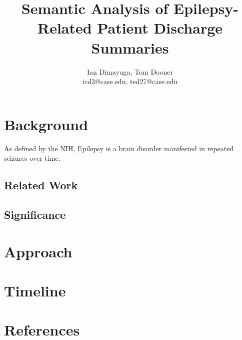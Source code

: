 \documentclass[12pt]{article}
\title{Semantic Analysis of Epilepsy-Related Patient Discharge Summaries}
\author{Ian Dimayuga, Tom Dooner \\icd3@case.edu, ted27@case.edu}
\begin{document}
\maketitle

\section{Background}
As defined by the NIH, Epilepsy is a brain disorder manifested in repeated seizures
over time.~\cite{nih-epilepsy}

\subsection{Related Work}

\subsection{Significance}

\section{Approach}

\section{Timeline}

\section{References}
{}

\end{document}
